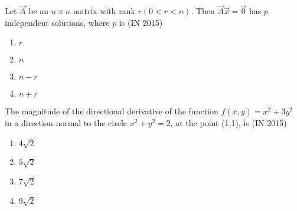 \item Let $\vec{A}$ be an $n \times n$ matrix with rank $r (0 < r < n)$. Then $\vec{A}\vec{x} = \vec{0}$ has $p$ independent solutions, where $p$ is
\hfill(IN 2015)
\begin{multicols}{4}
\begin{enumerate}
\item $r    $  
\item $n$
\item $n - r$
\item $n + r$
\end{enumerate}
  \end{multicols} 
\item The magnitude of the directional derivative of the function $f(x,y) = x^2 + 3y^2$ in a direction normal to the circle $x^2 + y^2 = 2$, at the point (1,1), is
\hfill(IN 2015)
\begin{multicols}{4}
\begin{enumerate}
\item $4\sqrt{2}$
\item $5\sqrt{2}$
\item $7\sqrt{2}$
\item $9\sqrt{2}$
\end{enumerate}
  \end{multicols} 

